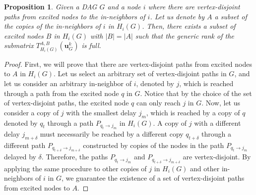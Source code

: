 \documentclass[letterpaper,10pt,journal]{IEEEtran}
\newcommand{\uu}{\mathbf{u}}
\newtheorem{proposition}{Proposition}
\begin{document}
\begin{proposition}\label{prop:generic_rank_vertex_disjoint}
Given a DAG $G$ and a node $i$ where there are vertex-disjoint paths from excited nodes to the in-neighbors of $i$. Let us denote by $A$ a subset of the copies of the in-neighbors of $i$ in $H_i(G)$. Then, there exists a subset of excited nodes $B$ in $H_i(G)$ with $|B|=|A|$ such that the generic rank of the submatrix $T_{H_i(G)}^{A,B}(\uu_G^k)$ is full.   
\end{proposition}
\begin{proof}
First, we will prove that there are vertex-disjoint paths from excited nodes to $A$ in $H_i(G)$.  Let us select an arbitrary set of vertex-disjoint paths in $G$, and let us  consider an arbitrary in-neighbor of $i$, denoted by $j$, which is reached through a path from the excited node $q$ in $G$. Notice that by the choice of the set of vertex-disjoint paths, the excited node $q$ can only reach $j$ in $G$. Now, let us consider a copy of $j$ with the smallest delay $j_m$, which is reached by a copy of $q$ denoted by $q_t$ through a path $P_{q_t\to j_m}$ in $H_i(G)$. A  copy of $j$ with a different delay $j_{m+\delta}$ must necessarily be reached by a different copy $q_{t+\delta}$ through a different path $P_{q_{t+\delta}\to j_{m+\delta}}$ constructed by copies of the nodes in the path $P_{q_t\to j_m}$ delayed by $\delta$. Therefore, the paths $P_{q_t\to j_m}$ and $P_{q_{t+\delta}\to j_{m+\delta}}$ are vertex-disjoint. By applying the same procedure to other copies of $j$ in $H_i(G)$ and other in-neighbors of $i$ in $G$, we guarantee the existence of a set of vertex-disjoint paths from excited nodes to $A$. 
   


\end{proof}
\end{document}
